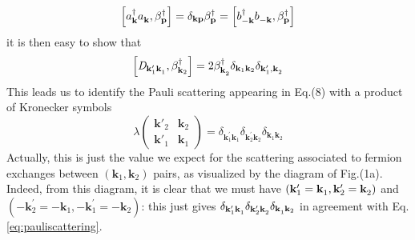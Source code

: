 \documentclass[aps,prb,superscriptaddress,showpacs,reprint,lengthcheck]{revtex4-1}
\newcommand{\vk}{\ensuremath{\mathbf{k}}}
\begin{document}
\begin{equation}  \label{eq:aBeta}
\left[a^{\dagger}_{\mathbf{k} }a^{}_{\mathbf{k} },\beta^{\dagger}_{\mathbf{p}
}\right]  =\delta_{\mathbf{k} \mathbf{p} }\beta^{\dagger}_{\mathbf{p} }=%
\left[b^{\dagger}_{-\mathbf{k} }b^{}_{-\mathbf{k} },\beta^{\dagger}_{\mathbf{%
p} }\right]  
\end{equation}
it is then easy to show that 
\begin{equation}  \label{eq:Dcom}
\left[\mathit{D} _{\mathbf{k} ^{\prime}_1\mathbf{k} ^{}_1},\beta^{\dagger}_{%
\mathbf{k} _2}\right]  =2\beta^{\dagger}_{\mathbf{k} ^{}_2}\delta_{\mathbf{k} _1%
\mathbf{k} _2}\delta_{\mathbf{k} ^{\prime}_1,\mathbf{k} ^{}_2}
\end{equation}
This leads us to identify the Pauli scattering appearing in Eq.(8) with a
product of Kronecker symbols 
\begin{equation}  \label{eq:pauliscattering}
\lambda\left(\begin{smallmatrix}\vk'_2&\vk_2\\\vk'_1&\vk_1\end{smallmatrix}%
\right)  =\delta_{\mathbf{k} ^{\prime}_1\mathbf{k} ^{}_1}\delta_{\mathbf{k}
^{\prime}_2\mathbf{k} ^{}_2}\delta_{\mathbf{k} ^{}_1\mathbf{k} ^{}_2}
\end{equation}
Actually, this is just the value we expect for the scattering associated to
fermion exchanges between $\left(\mathbf{k} _1,\mathbf{k} _2\right) $ pairs,
as visualized by the diagram of Fig.(1a). Indeed, from this
diagram, it is clear that we must have $\left(\mathbf{k} ^{\prime}_1=\mathbf{%
k} ^{}_1,\mathbf{k} ^{\prime}_2=\mathbf{k} ^{}_2\right) $ and $\left(-\mathbf{k}
^{\prime}_2=-\mathbf{k} ^{}_1,-\mathbf{k} ^{\prime}_1=-\mathbf{k} ^{}_2\right) $:
this just gives $\delta_{\mathbf{k} ^{\prime}_1\mathbf{k} ^{}_1}\delta_{\mathbf{%
k} ^{\prime}_2\mathbf{k} ^{}_2}\delta_{\mathbf{k} ^{}_1\mathbf{k} _2}$ in
agreement with Eq.\eqref{eq:pauliscattering}.
\end{document}
